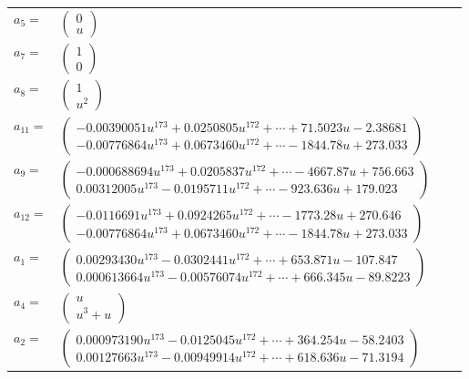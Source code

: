 \documentclass[1p]{elsarticle_modified}
\theoremstyle{definition}
\begin{document}
\begin{tabular}{m{7pt} m{180pt} m{7pt} m{180pt} }
\flushright $a_{5}=$&$\begin{pmatrix}0\\u\end{pmatrix}$ \\
\flushright $a_{7}=$&$\begin{pmatrix}1\\0\end{pmatrix}$ \\
\flushright $a_{8}=$&$\begin{pmatrix}1\\u^2\end{pmatrix}$ \\
\flushright $a_{11}=$&$\begin{pmatrix}-0.00390051 u^{173}+0.0250805 u^{172}+\cdots+71.5023 u-2.38681\\-0.00776864 u^{173}+0.0673460 u^{172}+\cdots-1844.78 u+273.033\end{pmatrix}$ \\
\flushright $a_{9}=$&$\begin{pmatrix}-0.000688694 u^{173}+0.0205837 u^{172}+\cdots-4667.87 u+756.663\\0.00312005 u^{173}-0.0195711 u^{172}+\cdots-923.636 u+179.023\end{pmatrix}$ \\
\flushright $a_{12}=$&$\begin{pmatrix}-0.0116691 u^{173}+0.0924265 u^{172}+\cdots-1773.28 u+270.646\\-0.00776864 u^{173}+0.0673460 u^{172}+\cdots-1844.78 u+273.033\end{pmatrix}$ \\
\flushright $a_{1}=$&$\begin{pmatrix}0.00293430 u^{173}-0.0302441 u^{172}+\cdots+653.871 u-107.847\\0.000613664 u^{173}-0.00576074 u^{172}+\cdots+666.345 u-89.8223\end{pmatrix}$ \\
\flushright $a_{4}=$&$\begin{pmatrix}u\\u^3+u\end{pmatrix}$ \\
\flushright $a_{2}=$&$\begin{pmatrix}0.000973190 u^{173}-0.0125045 u^{172}+\cdots+364.254 u-58.2403\\0.00127663 u^{173}-0.00949914 u^{172}+\cdots+618.636 u-71.3194\end{pmatrix}$ \\

\end{tabular}
\end{document}
